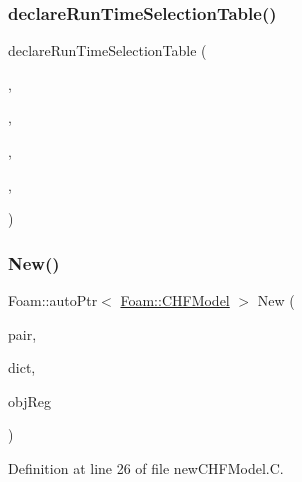 \mbox{\label{classFoam_1_1CHFModel_a53ab8dec0f497286b9ae27f8961dd246}} 
\subsubsection{\texorpdfstring{declare\+Run\+Time\+Selection\+Table()}{declareRunTimeSelectionTable()}}
{\footnotesize\ttfamily declare\+Run\+Time\+Selection\+Table (\begin{DoxyParamCaption}\item[{auto\+Ptr}]{,  }\item[{\hyperlink{classFoam_1_1CHFModel}{C\+H\+F\+Model}}]{,  }\item[{critical\+Heat\+Flux\+Models}]{,  }\item[{(const \hyperlink{classFoam_1_1FSPair}{F\+S\+Pair} \&pair, const dictionary \&dict, const object\+Registry \&obj\+Reg)}]{,  }\item[{(pair, dict, obj\+Reg)}]{ }\end{DoxyParamCaption})}

\mbox{\label{classFoam_1_1CHFModel_a7e263170f97b07d12b6c4669e7222647}} 
\subsubsection{\texorpdfstring{New()}{New()}}
{\footnotesize\ttfamily Foam\+::auto\+Ptr$<$ \hyperlink{classFoam_1_1CHFModel}{Foam\+::\+C\+H\+F\+Model} $>$ New (\begin{DoxyParamCaption}\item[{const \hyperlink{classFoam_1_1FSPair}{F\+S\+Pair} \&}]{pair,  }\item[{const dictionary \&}]{dict,  }\item[{const object\+Registry \&}]{obj\+Reg }\end{DoxyParamCaption})\hspace{0.3cm}{\ttfamily [static]}}



Definition at line 26 of file new\+C\+H\+F\+Model.\+C.



